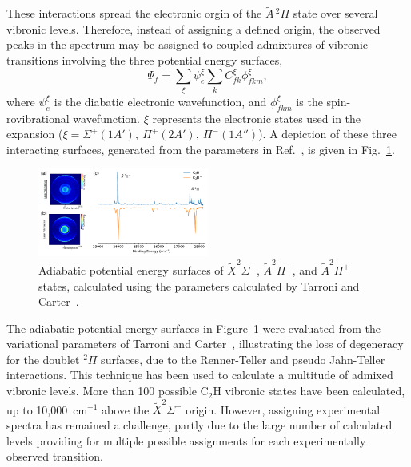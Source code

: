 \documentclass[aip,graphicx]{revtex4-1}
\begin{document}
These interactions spread the electronic orgin of the $\tilde{A}\,^2\Pi$ state over several vibronic levels. Therefore, instead of assigning a defined origin, the observed peaks in the spectrum may be assigned to coupled admixtures of vibronic transitions involving the three potential energy surfaces,
\begin{equation}
\Psi_f = \sum_\xi \psi_e^\xi \sum_k C_{fk}^\xi\phi_{fkm}^\xi,
\label{eq:teller3} 
\end{equation}
where $\psi_e^\xi$ is the diabatic electronic wavefunction, and $\phi_{fkm}^\xi$ is the spin-rovibrational wavefunction. $\xi$ represents the electronic states used in the expansion ($\xi=\Sigma^+(1A'),~\Pi^+(2A'),~\Pi^-(1A'')$). A depiction of these three interacting surfaces, generated from the parameters in Ref.~, is given in Fig.~\ref{fig:2}.

\begin{figure}
	\centering
	\includegraphics[width=0.5\textwidth]{figures/Fig2}
	\caption{Adiabatic potential energy surfaces of $\tilde{X}^2\Sigma^+$, $\tilde{A}^2\Pi^-$, and $\tilde{A}^2\Pi^+$ states, calculated using the parameters calculated by Tarroni and Carter~\cite{tar03}.}
	\label{fig:2}
\end{figure}

The adiabatic potential energy surfaces in Figure~\ref{fig:2} were evaluated from the variational parameters of Tarroni and Carter~\cite{tar03}, illustrating the loss of degeneracy for the doublet $^2\Pi$ surfaces, due to the Renner-Teller and pseudo Jahn-Teller interactions. This technique has been used to calculate a multitude of admixed vibronic levels. More than 100 possible C$_2$H vibronic states have been calculated, up to 10,000~cm$^{-1}$ above the $\tilde{X} ^2\Sigma^+$ origin. However, assigning experimental spectra has remained a challenge, partly due to the large number of calculated levels providing for multiple possible assignments for each experimentally observed transition.
\end{document}
